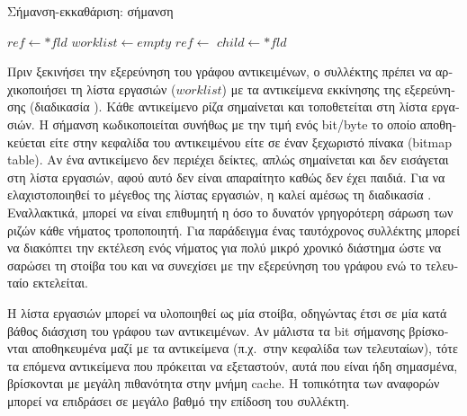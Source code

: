 \begin{greek}
\begin{algorithm}
  \caption{Σήμανση-εκκαθάριση: σήμανση}
  \label{alg:mrkswp_2}
  \begin{algorithmic}[1]
      \State {}
        \State $ref \gets *fld$
          \State {}
          \State {}
          \State {}
        \EndIf
      \EndFor
    \EndProcedure
    \Statex
      \State $worklist \gets empty$
    \EndProcedure
    \Statex
        \State $ref \gets$ 
          \State $child \gets *fld$
            \State {}
            \State {}
          \EndIf
        \EndFor
      \EndWhile
    \EndProcedure
  \end{algorithmic}
\end{algorithm}

Πριν ξεκινήσει την εξερεύνηση του γράφου αντικειμένων, ο
συλλέκτης πρέπει να αρχικοποιήσει τη λίστα εργασιών ($worklist$) 
με τα αντικείμενα εκκίνησης της εξερεύνησης (διαδικασία
). Κάθε αντικείμενο ρίζα σημαίνεται 
και τοποθετείται στη λίστα εργασιών. Η σήμανση κωδικοποιείται 
συνήθως με την τιμή ενός bit/byte το οποίο αποθηκεύεται είτε 
στην κεφαλίδα του αντικειμένου είτε σε έναν ξεχωριστό πίνακα 
(bitmap table). Αν ένα αντικείμενο δεν περιέχει δείκτες, 
απλώς σημαίνεται και δεν εισάγεται στη λίστα εργασιών, αφού 
αυτό δεν είναι απαραίτητο καθώς δεν έχει παιδιά. Για να
ελαχιστοποιηθεί το μέγεθος της λίστας εργασιών, η 
 καλεί αμέσως τη διαδικασία
. Εναλλακτικά, μπορεί να είναι επιθυμητή
η όσο το δυνατόν γρηγορότερη σάρωση των ριζών κάθε νήματος
τροποποιητή. Για παράδειγμα ένας ταυτόχρονος συλλέκτης 
μπορεί να διακόπτει την εκτέλεση ενός νήματος για πολύ
μικρό χρονικό διάστημα ώστε να σαρώσει τη στοίβα του
και να συνεχίσει με την εξερεύνηση του γράφου ενώ το
τελευταίο εκτελείται.

Η λίστα εργασιών μπορεί να υλοποιηθεί ως μία στοίβα, οδηγώντας 
έτσι σε μία κατά βάθος διάσχιση του γράφου των αντικειμένων. 
Αν μάλιστα τα bit σήμανσης βρίσκονται αποθηκευμένα μαζί με 
τα αντικείμενα (π.χ.\ στην κεφαλίδα των τελευταίων), τότε τα 
επόμενα αντικείμενα που πρόκειται να εξεταστούν, αυτά που 
είναι ήδη σημασμένα, βρίσκονται με μεγάλη πιθανότητα στην 
μνήμη cache. Η τοπικότητα των αναφορών μπορεί να επιδράσει
σε μεγάλο βαθμό την επίδοση του συλλέκτη.


\end{greek}
